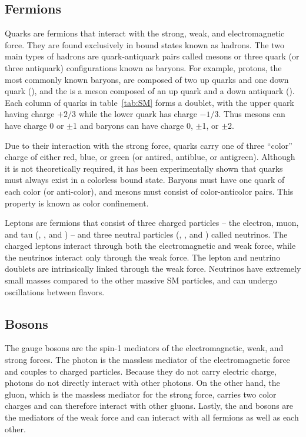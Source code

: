 \subsection{Fermions} \label{sec:sm_quarks}
Quarks are fermions that interact with the strong, weak, and electromagnetic force. They are found exclusively in bound states known as hadrons. The two main types of hadrons are quark-antiquark pairs called mesons or three quark (or three antiquark) configurations known as baryons. For example, protons, the most commonly known baryons, are composed of two up quarks and one down quark (\PQuns\PQuns\PQdns), and the \PGpp is a meson composed of an up quark and a down antiquark (\PQuns\PAQdns). Each column of quarks in table~\ref{tab:SM} forms a doublet, with the upper quark having charge $+2/3$ while the lower quark has charge $-1/3$. Thus mesons can have charge 0 or $\pm$1 and baryons can have charge 0, $\pm$1, or $\pm$2.

Due to their interaction with the strong force, quarks carry one of three ``color'' charge of either red, blue, or green (or antired, antiblue, or antigreen). Although it is not theoretically required, it has been experimentally shown that quarks must always exist in a colorless bound state. Baryons must have one quark of each color (or anti-color), and mesons must consist of color-anticolor pairs. This property is known as color confinement.

Leptons are fermions that consist of three charged particles -- the electron, muon, and tau (\Pe, \PGm, and \PGt) -- and three neutral particles (\PGne, \PGnGm, and \PGnGt) called neutrinos. The charged leptons interact through both the electromagnetic and weak force, while the neutrinos interact only through the weak force. The lepton and neutrino doublets are intrinsically linked through the weak force. Neutrinos have extremely small masses compared to the other massive SM particles, and can undergo oscillations between flavors.

\subsection{Bosons} \label{sec:sm_bosons}
The gauge bosons are the spin-1 mediators of the electromagnetic, weak, and strong forces. The photon is the massless mediator of the electromagnetic force and couples to charged particles. Because they do not carry electric charge, photons do not directly interact with other photons. On the other hand, the gluon, which is the massless mediator for the strong force, carries two color charges and can therefore interact with other gluons. Lastly, the \PZ and \PWpm bosons are the mediators of the weak force and can interact with all fermions as well as each other.

